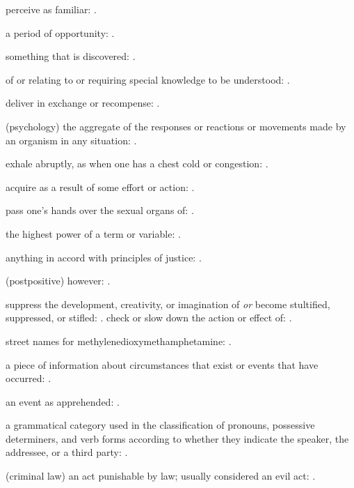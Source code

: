   perceive as familiar: .

  a period of opportunity: .

  something that is discovered: .

  of or relating to or requiring special knowledge to be understood:   .

  deliver in exchange or recompense: .

  (psychology) the aggregate of the responses or reactions or movements made by an organism in any situation:   .

  exhale abruptly, as when one has a chest cold or congestion: .

  acquire as a result of some effort or action: .

  pass one's hands over the sexual organs of: .

  the highest power of a term or variable: .

  anything in accord with principles of justice:   .

  (postpositive) however: .

  suppress the development, creativity, or imagination of \textit{or} become stultified, suppressed, or stifled:   . check or slow down the action or effect of: .

  street names for methylenedioxymethamphetamine:   .

  a piece of information about circumstances that exist or events that have occurred: .

  an event as apprehended: .

  a grammatical category used in the classification of pronouns, possessive determiners, and verb forms according to whether they indicate the speaker, the addressee, or a third party: .

  (criminal law) an act punishable by law; usually considered an evil act:   .

